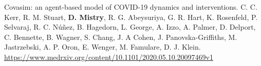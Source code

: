 \begin{cventries}
  \cvpublicationentrytwo
    {Covasim: an agent-based model of COVID-19 dynamics and interventions.} %
    {C. C. Kerr, R. M. Stuart, \textbf{D. Mistry}, R. G. Abeysuriya, G. R. Hart, K. Rosenfeld, P. Selvaraj, R. C. Núñez, B. Hagedorn, L. George, A. Izzo, A. Palmer, D. Delport, C. Bennette, B. Wagner, S. Chang, J. A Cohen, J. Panovska-Griffiths, M. Jastrzebski, A. P. Oron, E. Wenger, M. Famulare, D. J. Klein.} %
    {} %
    {} %
    {} %
    {} %
    {} %
    {\hspace{-6mm}} %
    {\href{https://www.medrxiv.org/content/10.1101/2020.05.10.20097469v1}{https://www.medrxiv.org/content/10.1101/2020.05.10.20097469v1 \faLink\acvHeaderIconSep}} %
    \vspace{1.5mm}

\end{cventries}




